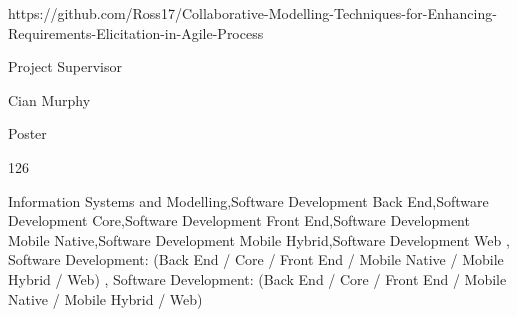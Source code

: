 {https://github.com/Ross17/Collaborative-Modelling-Techniques-for-Enhancing-Requirements-Elicitation-in-Agile-Process}

{Project Supervisor}

{}

{Cian Murphy}

{Poster}

{126}

{Information Systems and Modelling,Software Development Back End,Software Development Core,Software Development Front End,Software Development Mobile Native,Software Development Mobile Hybrid,Software Development Web}
{, Software Development: (Back End / Core / Front End / Mobile Native / Mobile Hybrid / Web)}
{, Software Development: (Back End / Core / Front End / Mobile Native / Mobile Hybrid / Web)}

\endgroup

\DefaultLayout
